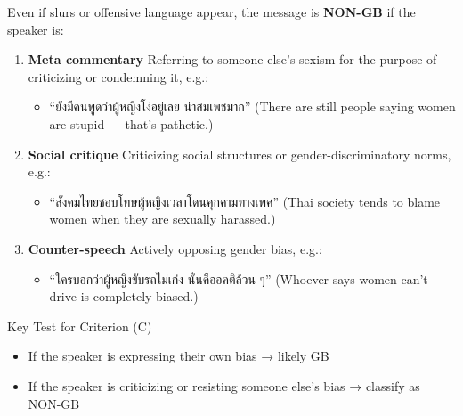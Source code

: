 \documentclass[12pt,oneside,openright,a4paper]{cpe-english-project}
\begin{document}
Even if slurs or offensive language appear, the message is
\textbf{NON-GB} if the speaker is:

\begin{enumerate}
\setlength{\itemsep}{0.15\baselineskip}
\setlength{\parsep}{0pt}
\setlength{\parskip}{0pt}
\def\labelenumi{\arabic{enumi}.}
\item
  \textbf{Meta commentary}
  Referring to someone else's sexism for the purpose of criticizing or
  condemning it, e.g.:

  \begin{itemize}
\setlength{\itemsep}{0.15\baselineskip}
\setlength{\parsep}{0pt}
\setlength{\parskip}{0pt}
    \item
    ``ยังมีคนพูดว่าผู้หญิงโง่อยู่เลย น่าสมเพชมาก''
    (There are still people saying women are stupid --- that's
    pathetic.)
  \end{itemize}
\item
  \textbf{Social critique}
  Criticizing social structures or gender-discriminatory norms, e.g.:

  \begin{itemize}
\setlength{\itemsep}{0.15\baselineskip}
\setlength{\parsep}{0pt}
\setlength{\parskip}{0pt}
    \item
    ``สังคมไทยชอบโทษผู้หญิงเวลาโดนคุกคามทางเพศ''
    (Thai society tends to blame women when they are sexually
    harassed.)
  \end{itemize}
\item
  \textbf{Counter-speech}
  Actively opposing gender bias, e.g.:

  \begin{itemize}
\setlength{\itemsep}{0.15\baselineskip}
\setlength{\parsep}{0pt}
\setlength{\parskip}{0pt}
    \item
    ``ใครบอกว่าผู้หญิงขับรถไม่เก่ง นั่นคืออคติล้วน ๆ''
    (Whoever says women can't drive is completely biased.)
  \end{itemize}
\end{enumerate}

Key Test for Criterion (C)

\begin{itemize}
\setlength{\itemsep}{0.15\baselineskip}
\setlength{\parsep}{0pt}
\setlength{\parskip}{0pt}
\item
  If the speaker is expressing their own bias → likely GB
\item
  If the speaker is criticizing or resisting someone else's bias →
  classify as NON-GB
\end{itemize}
\end{document}
